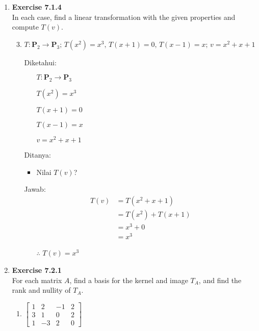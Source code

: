 \documentclass[12pt, a4paper]{scrartcl}
\begin{document}
\begin{enumerate}
        \item \textbf{Exercise 7.1.4}\\In each case, find a linear transformation with the given properties and compute $T(v)$.
        \begin{enumerate}
            \setcounter{enumii}{2}
            \item $T : \textbf{P}_2 \to \textbf{P}_3 \mbox{; } T(x^2)=x^3 \mbox{, } T(x+1)=0 \mbox{, } T(x-1)=x \mbox{; } v=x^2+x+1$
            
            Diketahui:
            \begin{itemize}
                \item[] $T : \textbf{P}_2 \to \textbf{P}_3 $\item[]$ T(x^2)=x^3 $\item[]$ T(x+1)=0 $\item[]$ T(x-1)=x $\item[]$ v=x^2+x+1$
            \end{itemize}

            Ditanya:
            \begin{itemize}
                \item Nilai $T(v)$?
            \end{itemize}

            Jawab:
            \begin{align*}
                T(v) &= T(x^2+x+1)\\
                &= T(x^2) + T(x+1)\\
                &= x^3 + 0\\
                &= x^3
            \end{align*}
            \begin{itemize}
                \item[$\therefore$] $T(v)=x^3$
            \end{itemize}
        \end{enumerate}

        \item \textbf{Exercise 7.2.1}\\For each matrix $A$, find a basis for the kernel and image $T_{A}$, and find the rank and nullity of $T_{A}$.
        \begin{enumerate}
            \item $\begin{bmatrix}
                1 & 2 & -1 & 2\\
                3 & 1 & 0 & 2 \\
                1 & -3 & 2 & 0
            \end{bmatrix}$


\end{enumerate}
\end{enumerate}
\end{document}
